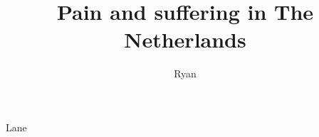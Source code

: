 \documentclass{thesis}
\begin{document}
\newcommand{\needref}{[\textit{\textcolor{orange}{references}}]}


\title{Pain and suffering in The Netherlands}
\author{Ryan}{Lane}

\frontmatter  %
% 

\tableofcontents


\mainmatter  %


% 


\end{document}
